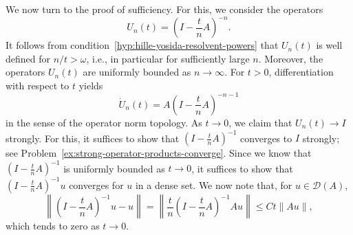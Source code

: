 We now turn to the proof of sufficiency. For this, we consider the operators
\begin{equation}\label{eq:hille-yosida-implicit-resolvent-power-approximant}
U_n(t)=\left(I-\dfrac{t}{n}A\right)^{-n}.
\end{equation}
It follows from condition~\ref{hyp:hille-yosida-resolvent-powers} that $U_n(t)$ is well defined for $n/t>\omega$, i.e., in particular for sufficiently large $n$. Moreover, the operators $U_n(t)$ are uniformly bounded as $n\to\infty$. For $t>0$, differentiation with respect to $t$ yields
\begin{equation}\label{eq:hille-yosida-approximant-time-derivative}
\dot U_n(t)=A\left(I-\dfrac{t}{n}A\right)^{-n-1}
\end{equation}
in the sense of the operator norm topology. As $t\to0$, we claim that $U_n(t)\to I$ strongly. For this, it suffices to show that $(I-\frac{t}{n}A)^{-1}$ converges to $I$ strongly; see Problem~\ref{ex:strong-operator-products-converge}. Since we know that $(I-\frac{t}{n}A)^{-1}$ is uniformly bounded as $t\to0$, it suffices to show that $(I-\frac{t}{n}A)^{-1}u$ converges for $u$ in a dense set. We now note that, for $u\in\mathcal{D}(A)$,
\begin{equation}\label{eq:hille-yosida-resolvent-initial-strong-limit-bound}
\left\|\left(I-\dfrac{t}{n}A\right)^{-1}u-u\right\|=\left\|\dfrac{t}{n}\left(I-\dfrac{t}{n}A\right)^{-1}Au\right\|\leq Ct\|Au\|,
\end{equation}
which tends to zero as $t\to0$.

